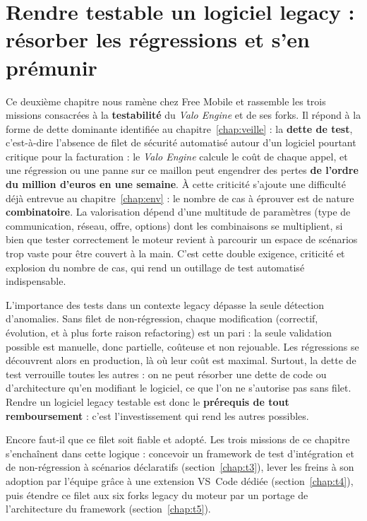 \chapter{Rendre testable un logiciel legacy : résorber les régressions et s'en prémunir}
\label{chap:testabilite}

Ce deuxième chapitre nous ramène chez Free Mobile et rassemble les trois
missions consacrées à la \textbf{testabilité} du \emph{Valo Engine} et de ses
forks. Il répond à la forme de dette dominante identifiée au
chapitre~\ref{chap:veille} : la \textbf{dette de test}, c'est-à-dire
l'absence de filet de sécurité automatisé autour d'un logiciel pourtant
critique pour la facturation : le \emph{Valo Engine} calcule le coût de
chaque appel, et une régression ou une panne sur ce maillon peut engendrer
des pertes \textbf{de l'ordre du million d'euros en une semaine}. À cette
criticité s'ajoute une difficulté déjà entrevue au chapitre~\ref{chap:env} : le
nombre de cas à éprouver est de nature \textbf{combinatoire}. La valorisation
dépend d'une multitude de paramètres (type de communication, réseau, offre,
options) dont les combinaisons se multiplient, si bien que tester correctement
le moteur revient à parcourir un espace de scénarios trop vaste pour être
couvert à la main. C'est cette double exigence, criticité et explosion du
nombre de cas, qui rend un outillage de test automatisé indispensable.

L'importance des tests dans un contexte legacy dépasse la seule détection
d'anomalies. Sans filet de non-régression, chaque modification (correctif,
évolution, et à plus forte raison refactoring) est un pari : la seule
validation possible est manuelle, donc partielle, coûteuse et non rejouable.
Les régressions se découvrent alors en production, là où leur coût est
maximal. Surtout, la dette de test verrouille toutes les autres : on ne peut
résorber une dette de code ou d'architecture qu'en modifiant le logiciel, ce
que l'on ne s'autorise pas sans filet. Rendre un logiciel legacy testable est
donc le \textbf{prérequis de tout remboursement} : c'est l'investissement qui
rend les autres possibles.

Encore faut-il que ce filet soit fiable et adopté. Les trois missions de ce
chapitre s'enchaînent dans cette logique : concevoir un framework de test
d'intégration et de non-régression à scénarios déclaratifs
(section~\ref{chap:t3}), lever les freins à son adoption par l'équipe grâce à
une extension VS~Code dédiée (section~\ref{chap:t4}), puis étendre ce filet
aux six forks legacy du moteur par un portage de l'architecture du framework
(section~\ref{chap:t5}).
